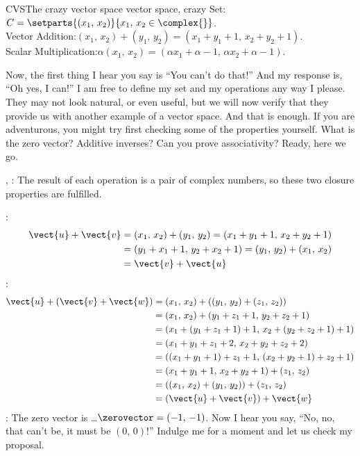 \begin{example}{CVS}{The crazy vector space }{vector space, crazy}
Set:\quad $C=\setparts{(x_1,\,x_2)}{x_1,\,x_2\in\complex{\null}}$.\\
Vector Addition:\quad  $(x_1,\,x_2)+(y_1,\,y_2)=(x_1+y_1+1,\,x_2+y_2+1)$.\\
Scalar Multiplication:\quad $\alpha(x_1,\,x_2)=(\alpha x_1+\alpha-1,\,\alpha x_2+\alpha-1)$.\par\medskip
%
Now, the first thing I hear you say is ``You can't do that!''  And my response is, ``Oh yes, I can!''  I am free to define my set and my operations any way I please.  They may not look natural, or even useful, but we will now verify that they provide us with another example of a vector space.  And that is enough.  If you are adventurous, you might try first checking some of the properties yourself.  What is the zero vector?  Additive inverses?  Can you prove associativity?  Ready, here we go.\par
%
, :  The result of each operation is a pair of complex numbers, so these two closure properties are fulfilled.\par
%
:
%
\begin{align*}
\vect{u}+\vect{v}&=(x_1,\,x_2)+(y_1,\,y_2)=(x_1+y_1+1,\,x_2+y_2+1)\\
&=(y_1+x_1+1,\,y_2+x_2+1)=(y_1,\,y_2)+(x_1,\,x_2)\\
&=\vect{v}+\vect{u}
\end{align*}
%
:
%
\begin{align*}
\vect{u}+(\vect{v}+\vect{w})&=(x_1,\,x_2)+\left((y_1,\,y_2)+(z_1,\,z_2)\right)\\
&=(x_1,\,x_2)+(y_1+z_1+1,\,y_2+z_2+1)\\
&=(x_1+(y_1+z_1+1)+1,\,x_2+(y_2+z_2+1)+1)\\
&=(x_1+y_1+z_1+2,\,x_2+y_2+z_2+2)\\
&=((x_1+y_1+1)+z_1+1,\,(x_2+y_2+1)+z_2+1)\\
&=(x_1+y_1+1,\,x_2+y_2+1)+(z_1,\,z_2)\\
&=\left((x_1,\,x_2)+(y_1,\,y_2)\right)+(z_1,\,z_2)\\
&=\left(\vect{u}+\vect{v}\right)+\vect{w}
\end{align*}
%
:  The zero vector is \dots $\zerovector=(-1,\,-1)$.  Now I hear you say, ``No, no, that can't be, it must be $(0,\,0)$!''  Indulge me for a moment and let us check my proposal.
%
\begin{equation*}

\end{equation*}
\end{example}

